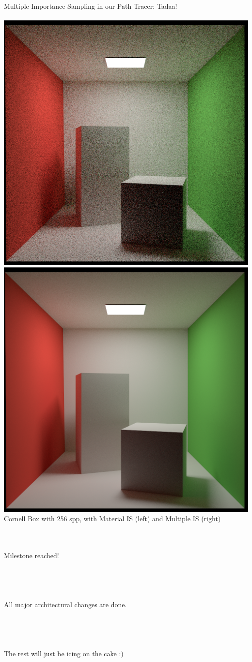 \documentclass[utf8,stillsansserifmath,fleqn,t]{beamer}
\begin{document}
\begin{frame}[label=mis-3]
\frametitle{\insertsection}
Multiple Importance Sampling in our Path Tracer: Tadaa!\\~\\
\includegraphics[width=.48\textwidth]{./fig/pathtracer-result-09-1.png}\hfill
\includegraphics[width=.48\textwidth]{./fig/pathtracer-result-11-1.png}\\
Cornell Box with 256 spp, with Material IS (left) and Multiple IS (right)
\end{frame}

\begin{frame}
\frametitle{\insertsection}
\LARGE

~

\centerline{Milestone reached!}

~

~

\centerline{All major architectural changes are done.}

~

~

\centerline{The rest will just be icing on the cake :)}
\end{frame}
\end{document}
